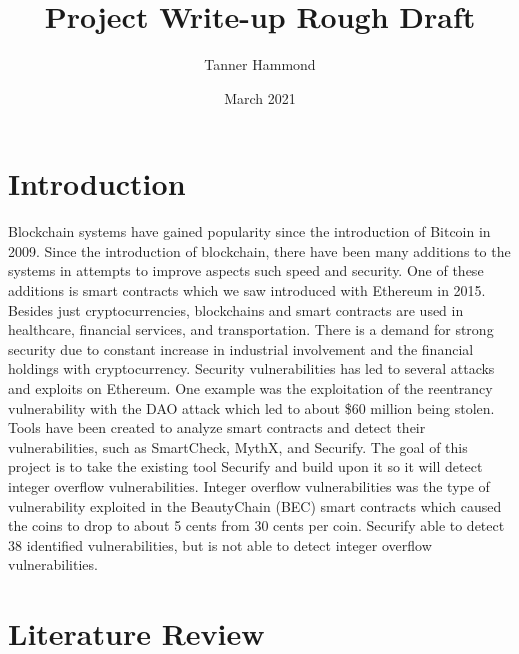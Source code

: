 \documentclass{article}
\title{Project Write-up Rough Draft}
\author{Tanner Hammond}
\date{March 2021}
\begin{document}
\maketitle

\section{Introduction}

Blockchain systems have gained popularity since the introduction of Bitcoin in 2009. Since the introduction of blockchain, there have been many additions to the systems in attempts to improve aspects such speed and security. One of these additions is smart contracts which we saw introduced with Ethereum in 2015. Besides just cryptocurrencies, blockchains and smart contracts are used in healthcare, financial services, and transportation. There is a demand for strong security due to constant increase in industrial involvement and the financial holdings with cryptocurrency. Security vulnerabilities has led to several attacks and exploits on Ethereum. One example was the exploitation of the reentrancy vulnerability with the DAO attack which led to about \$60 million being stolen. Tools have been created to analyze smart contracts and detect their vulnerabilities, such as SmartCheck, MythX, and Securify. The goal of this project is to take the existing tool Securify and build upon it so it will detect integer overflow vulnerabilities. Integer overflow vulnerabilities was the type of vulnerability exploited in the BeautyChain (BEC) smart contracts which caused the coins to drop to about 5 cents from 30 cents per coin. Securify \cite{Securify} able to detect 38 identified vulnerabilities, but is not able to detect integer overflow vulnerabilities.

\section{Literature Review}
\end{document}
